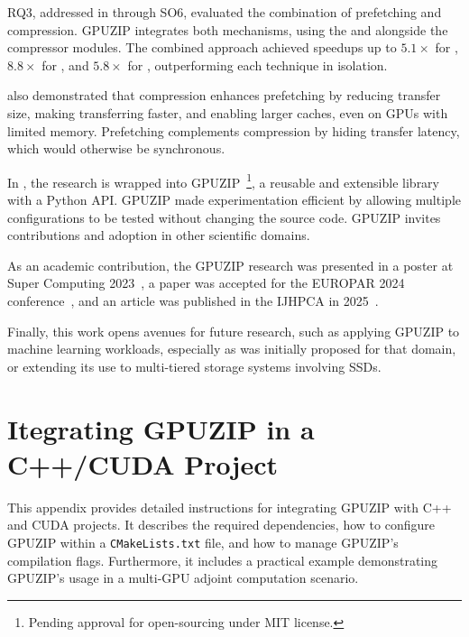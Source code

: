 \documentclass[Ingles]{ic-tese-v3}
\begin{document}
RQ3, addressed in  through SO6, evaluated the combination of prefetching and compression. GPUZIP integrates both mechanisms, using the \cache and \psa alongside the compressor modules. The combined approach achieved speedups up to $5.1\times$ for \revolve, $8.8\times$ for \zcut, and $5.8\times$ for \uniform, outperforming each technique in isolation.

 also demonstrated that compression enhances prefetching by reducing transfer size, making transferring faster, and enabling larger caches, even on GPUs with limited memory. Prefetching complements compression by hiding \htd transfer latency, which would otherwise be synchronous.

In , the research is wrapped into GPUZIP~\cite{githubrepo}\footnote{Pending approval for open-sourcing under MIT license.}, a reusable and extensible library with a Python API. GPUZIP made experimentation efficient by allowing multiple configurations to be tested without changing the \awave source code. GPUZIP invites contributions and adoption in other scientific domains.

As an academic contribution, the GPUZIP research was presented in a poster at Super Computing 2023~\cite{sc23}, a paper was accepted for the EUROPAR 2024 conference~\cite {europar}, and an article was published in the IJHPCA in 2025~\cite{ijhpca}. 

Finally, this work opens avenues for future research, such as applying GPUZIP to machine learning workloads, especially as \zcut was initially proposed for that domain, or extending its use to multi-tiered storage systems involving SSDs.







\appendix
\chapter{Itegrating GPUZIP in a C++/CUDA Project}
\label{appendix:gpuzip}

This appendix provides detailed instructions for integrating GPUZIP with C++ and CUDA projects. It describes the required dependencies, how to configure GPUZIP within a \texttt{CMakeLists.txt} file, and how to manage GPUZIP's compilation flags. Furthermore, it includes a practical example demonstrating GPUZIP's usage in a multi-GPU adjoint computation scenario.
\end{document}
